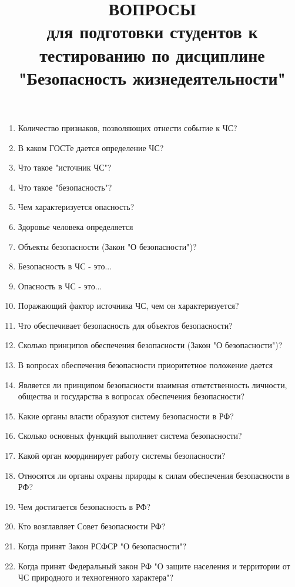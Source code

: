 \documentclass[oneside,final,14pt]{extreport}
\begin{document}
\title{ВОПРОСЫ \\
	для подготовки студентов к тестированию по дисциплине "Безопасность жизнедеятельности"}
\maketitle

\begin{enumerate}
	\item Количество признаков, позволяющих отнести событие к ЧС?
	\item В каком ГОСТе дается определение ЧС?
	\item  Что такое "источник ЧС"?
	\item  Что такое "безопасность"?
	\item  Чем характеризуется опасность?
	\item  Здоровье человека определяется
	\item  Объекты безопасности (Закон "О безопасности")?
	\item  Безопасность в ЧС - это...
	\item  Опасность в ЧС - это...
	\item  Поражающий фактор источника ЧС, чем он характеризуется?
	\item  Что обеспечивает безопасность для объектов безопасности?
	\item  Сколько принципов обеспечения безопасности (Закон "О безопасности")?
	\item  В вопросах обеспечения безопасности приоритетное положение дается
	\item  Является ли принципом безопасности взаимная ответственность личности, общества и государства в вопросах обеспечения безопасности?
	\item  Какие органы власти образуют систему безопасности в РФ?
	\item  Сколько основных функций выполняет система безопасности?
	\item  Какой орган координирует работу системы безопасности?
	\item  Относятся ли органы охраны природы к силам обеспечения безопасности в РФ?
	\item  Чем достигается безопасность в РФ?
	\item Кто возглавляет Совет безопасности РФ?
	\item  Когда принят Закон РСФСР "О безопасности"?
	\item  Когда принят Федеральный закон РФ "О защите населения и территории от ЧС природного и техногенного характера"?

\end{enumerate}
\end{document}
